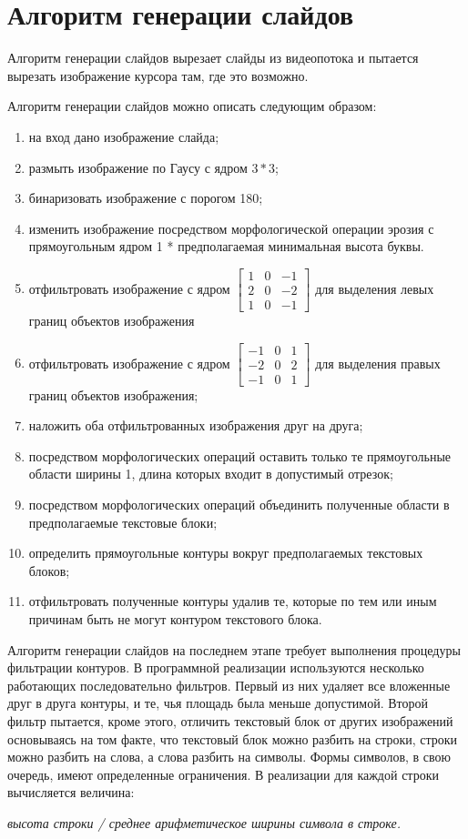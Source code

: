 \documentclass[oneside,final,14pt]{extreport}
\begin{document}
\section{Алгоритм генерации слайдов}
Алгоритм генерации слайдов вырезает слайды из видеопотока и пытается вырезать изображение курсора там, где это возможно.

Алгоритм генерации слайдов можно описать следующим образом:
\begin{enumerate}
\item на вход дано изображение слайда;
\item размыть изображение по Гаусу с ядром $3*3$;
\item бинаризовать изображение с порогом 180;
\item изменить изображение посредством морфологической операции эрозия с прямоугольным ядром 1 * предполагаемая минимальная высота буквы. 
\item отфильтровать изображение с ядром  
$\begin{bmatrix}
1 & 0 & -1 \\
2 & 0 & -2 \\
1 & 0 & -1
\end{bmatrix}$ для выделения левых границ объектов изображения
\item отфильтровать изображение с ядром 
$\begin{bmatrix}
-1 & 0 &  1 \\
-2 & 0 &  2 \\
-1 & 0 &  1
\end{bmatrix}$ для выделения правых границ объектов изображения;
\item наложить оба отфильтрованных изображения друг на друга;
\item посредством морфологических операций оставить только те прямоугольные области ширины 1, длина которых  входит в допустимый отрезок;
\item посредством морфологических операций объединить полученные области в предполагаемые текстовые блоки;
\item определить прямоугольные контуры вокруг предполагаемых текстовых блоков;
\item отфильтровать полученные контуры удалив те, которые по тем или иным причинам быть не могут контуром текстового блока.
\end{enumerate}

Алгоритм генерации слайдов на последнем этапе требует выполнения процедуры фильтрации контуров. В программной реализации используются несколько работающих последовательно фильтров. Первый из них удаляет все вложенные друг в друга контуры, и те, чья площадь была меньше допустимой. Второй фильтр пытается, кроме этого, отличить текстовый блок от других изображений основываясь на том факте, что текстовый блок можно разбить на строки, строки можно разбить на слова, а слова разбить на символы. Формы символов, в свою очередь, имеют определенные ограничения. В реализации для каждой строки вычисляется величина:
\begin{center}
\textit{
высота строки / среднее арифметическое ширины символа в строке.
}
\end{center}
\end{document}
